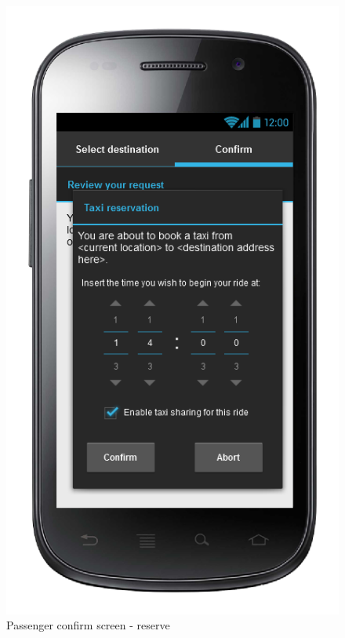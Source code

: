 \begin{center}
\begin{figure} [h]
  	  \includegraphics[scale=0.5]{ui/Passenger confirm screen - reserve.png}
\caption{Passenger confirm screen -  reserve}
  
	\end{figure}
\end{center}

